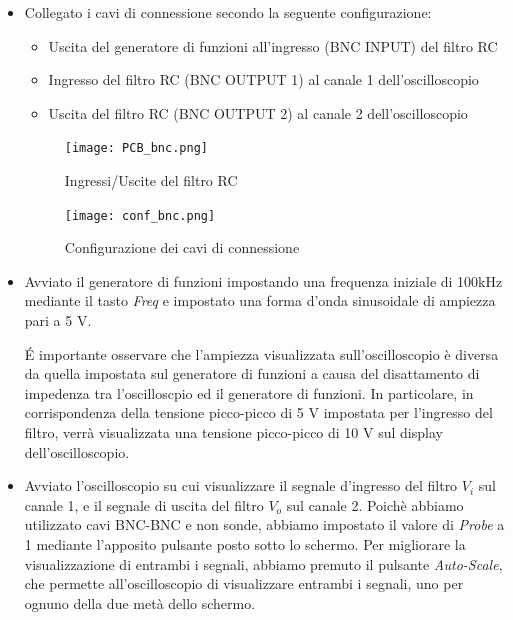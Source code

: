 \begin{itemize}
    \item Collegato i cavi di connessione secondo la seguente configurazione:
    \begin{itemize}
        \item Uscita del generatore di funzioni all'ingresso (BNC INPUT) del filtro RC
        \item Ingresso del filtro RC (BNC OUTPUT 1) al canale 1 dell'oscilloscopio
        \item Uscita del filtro RC (BNC OUTPUT 2) al canale 2 dell'oscilloscopio
    \end{itemize}
    \begin{figure}[h]
        \centering
        \texttt{[image: PCB\_bnc.png]}
        \caption{Ingressi/Uscite del filtro RC}
        \label{fig:pcb_bnc}
    \end{figure}
    \begin{figure}[h]
        \centering
        \texttt{[image: conf\_bnc.png]}
        \caption{Configurazione dei cavi di connessione}
        \label{fig:conf_bnc}
    \end{figure}
    \FloatBarrier

    \item Avviato il generatore di funzioni impostando una frequenza iniziale di 100kHz mediante il tasto \emph{Freq} e impostato una forma d'onda sinusoidale di ampiezza pari a 5 V.
    
    \'E importante osservare che l'ampiezza visualizzata sull'oscilloscopio è diversa da quella impostata sul generatore di funzioni a causa del disattamento di impedenza tra l'oscilloscpio ed il generatore di funzioni. In particolare, in corrispondenza della tensione picco-picco di 5 V impostata per l'ingresso del filtro, verrà visualizzata una tensione picco-picco di 10 V sul display dell'oscilloscopio.
    \item Avviato l'oscilloscopio su cui visualizzare il segnale d'ingresso del filtro $V_i$ sul canale 1, e il segnale di uscita del filtro $V_o$ sul canale 2.
    Poichè abbiamo utilizzato cavi BNC-BNC e non sonde, abbiamo impostato il valore di \emph{Probe} a 1 mediante l'apposito pulsante posto sotto lo schermo.
    Per migliorare la visualizzazione di entrambi i segnali, abbiamo premuto il pulsante \emph{Auto-Scale}, che permette all'oscilloscopio di visualizzare entrambi i segnali, uno per ognuno della due metà dello schermo.
    

\end{itemize}
